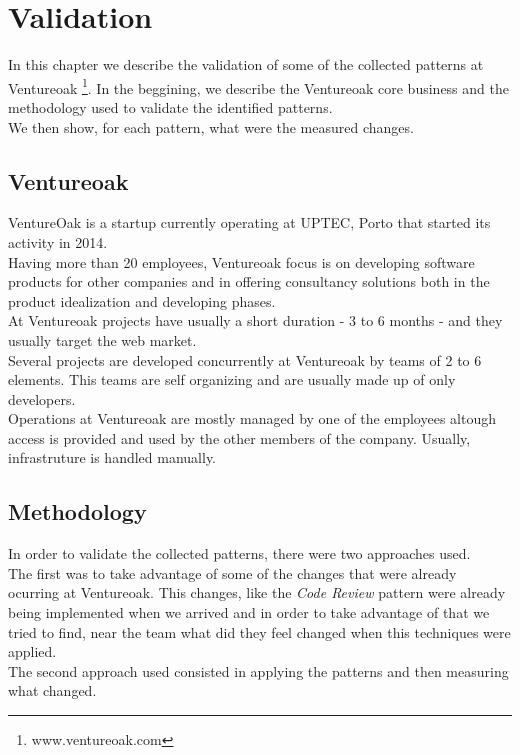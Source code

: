 \chapter{ Validation } \label{chap:validation}
	In this chapter we describe the validation of some of the collected patterns at Ventureoak \footnote{www.ventureoak.com}. In the beggining, we describe the Ventureoak core business and the methodology used to validate the identified patterns.\\
	We then show, for each pattern, what were the measured changes.

	\section{Ventureoak}
	VentureOak is a startup currently operating at UPTEC, Porto that started its activity in 2014. \\
	Having more than 20 employees, Ventureoak focus is on developing software products for other companies and in offering consultancy solutions both in the product idealization and developing phases. \\
	At Ventureoak projects have usually a short duration - 3 to 6 months - and they usually target the web market. \\
	Several projects are developed concurrently at Ventureoak by teams of 2 to 6 elements. This teams are self organizing and are usually made up of only developers. \\
	Operations at Ventureoak are mostly managed by one of the employees altough access is provided and used by the other members of the company. Usually, infrastruture is handled manually.\\

	\section{Methodology} \label{chap:validation:sec:methodology}
	In order to validate the collected patterns, there were two approaches used. \\
	The first was to take advantage of some of the changes that were already ocurring at Ventureoak. This changes, like the \textit{Code Review} pattern were already being implemented when we arrived and in order to take advantage of that we tried to find, near the team what did they feel changed when this techniques were applied.\\
	The second approach used consisted in applying the patterns and then measuring what changed.

